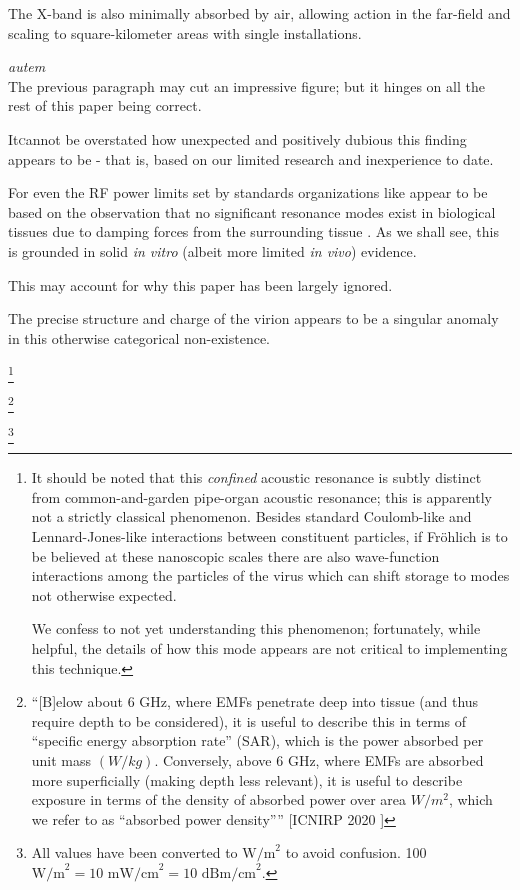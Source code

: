 \documentclass[fleqn,10pt]{article}
\begin{document}
\begin{multicols}{1}
The X-band is also minimally absorbed by air, allowing action in the far-field and scaling to square-kilometer areas with single installations.

\begin{autem}

{\it autem}\\
The previous paragraph may cut an impressive figure; but it hinges on all the rest of this paper being correct.

\end{autem}

\lettrine{It} cannot be overstated how unexpected and positively dubious this finding appears to be - that is, based on our limited research and inexperience to date.

For even the RF power limits set by standards organizations like \cite{ICNIRP2020} \cite{IEEE2006} appear to be based on the observation that no significant resonance modes exist in biological tissues due to damping forces from the surrounding tissue \cite{Vibrational2002}. As we shall see, this is grounded in solid {\it in vitro} (albeit more limited {\it in vivo}) evidence. 

This may account for why this paper has been largely ignored.

The precise structure and charge of the virion appears to be a singular anomaly in this otherwise categorical non-existence.


\footnote{It should be noted that this {\it confined} acoustic resonance is subtly distinct from common-and-garden pipe-organ acoustic resonance; this is apparently not a strictly classical phenomenon. Besides standard Coulomb-like and Lennard-Jones-like interactions between constituent particles, if Fr\"{o}hlich is to be believed at these nanoscopic scales there are also wave-function interactions among the particles of the virus which can shift storage to modes not otherwise expected.

We confess to not yet understanding this phenomenon; fortunately, while helpful, the details of how this mode appears are not critical to implementing this technique.}

\footnote{``{[B]elow about 6 GHz, where EMFs penetrate deep into tissue (and thus require depth to be considered), it is useful to describe this in terms of “specific energy absorption rate” (SAR), which is the power absorbed per unit mass $(W/kg)$. Conversely, above 6 GHz, where EMFs are absorbed more superficially (making depth less relevant), it is useful to describe exposure in terms of the density of absorbed power over area $W/m^2$, which we refer to as “absorbed power density”}'' [ICNIRP 2020 \faExternalLink] }



\footnote{All values have been converted to $\text{W/m}^2$ to avoid confusion. 100 $\text{W/m}^2 = 10 \text{ mW/cm}^2 = 10 \text{ dBm/cm}^2$.}



\end{multicols}
\clearpage
\end{document}
